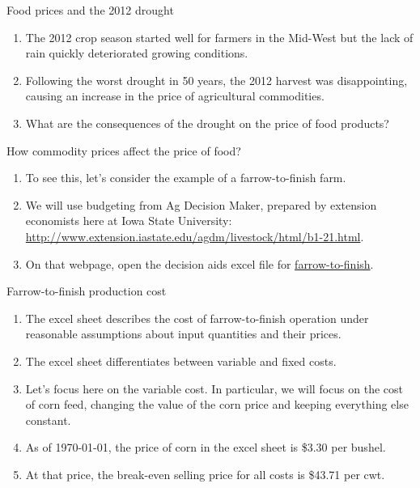 \documentclass[table,xcolor=pdftex,dvipsnames, handout]{beamer}\usepackage[]{graphicx}\usepackage[]{color}
\begin{document}
\begin{frame}{Food prices and the 2012 drought}
\begin{enumerate}[label=\textbullet]
  \item The 2012 crop season started well for farmers in the Mid-West but the lack of rain quickly deteriorated growing conditions.
  \item Following the worst drought in 50 years, the 2012 harvest was disappointing, causing an increase in the price of agricultural commodities.
  \item What are the consequences of the drought on the price of food products?
\end{enumerate}
\end{frame}


\begin{frame}{How commodity prices affect the price of food?}
\begin{enumerate}[label=\textbullet]
  \item To see this, let's consider the example of a farrow-to-finish farm.
  \item We will use budgeting from Ag Decision Maker, prepared by extension economists here at Iowa State University: \url{http://www.extension.iastate.edu/agdm/livestock/html/b1-21.html}.
  \item On that webpage, open the decision aids excel file for \href{http://www.extension.iastate.edu/agdm/livestock/xls/b1-21farrowtofinishp6.xlsx}{farrow-to-finish}.
\end{enumerate}
\end{frame}


\begin{frame}{Farrow-to-finish production cost}
\begin{enumerate}[label=\textbullet]
  \item The excel sheet describes the cost of farrow-to-finish operation under reasonable assumptions about input quantities and their prices.
  \item The excel sheet differentiates between variable and fixed costs.
  \item Let's focus here on the variable cost. In particular, we will focus on the cost of corn feed, changing the value of the corn price and keeping everything else constant.
  \item As of \today, the price of corn in the excel sheet is \$3.30 per bushel.
  \item At that price, the break-even selling price for all costs is \$43.71 per cwt.
\end{enumerate}
\end{frame}
\end{document}
